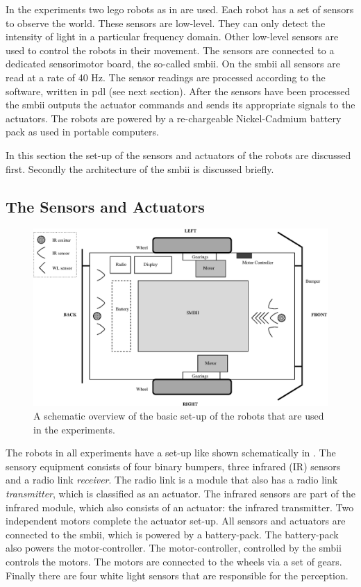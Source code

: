 In the experiments two {\sc lego} robots as in  are used. Each robot has a set of sensors to observe the world. These sensors are low-level. They can only detect the intensity of light in a particular frequency domain. Other low-level sensors are used to control the robots in their movement. The sensors are connected to a dedicated sensorimotor board, the so-called {\sc smbii}. On the {\sc smbii} all sensors are read at a rate of 40 Hz. The sensor readings are processed according to the software, written in {\sc pdl} (see next section). After the sensors have been processed the {\sc smbii} outputs the actuator commands and sends its appropriate signals to the actuators. The robots are powered by a re-chargeable Nickel-Cadmium battery pack as used in portable computers.

In this section the set-up of the sensors and actuators of the robots are discussed first. Secondly the architecture of the {\sc smbii} is discussed briefly.

\subsection{The Sensors and Actuators}\label{s:robots:sensors}

\begin{figure}[t]
\centerline{\includegraphics[width=12cm]{robots//schema_robots_exp2.eps}}
\caption{A schematic overview of the basic set-up of the robots that are used in the experiments.}
\label{f:robots:robots_general}
\end{figure}

The robots in all experiments have a set-up like shown schematically in . The sensory equipment consists of four binary bumpers, three infrared (IR) sensors and a radio link {\em receiver}. The radio link is a module that also has a radio link {\em transmitter}, which is classified as an actuator. The infrared sensors are part of the infrared module, which also consists of an actuator: the infrared transmitter. Two independent motors complete the actuator set-up. All sensors and actuators are connected to the {\sc smbii}, which is powered by a battery-pack. The battery-pack also powers the motor-controller. The motor-controller, controlled by the {\sc smbii} controls the motors. The motors are connected to the wheels via a set of gears. Finally there are four white light sensors that are responsible for the perception.

